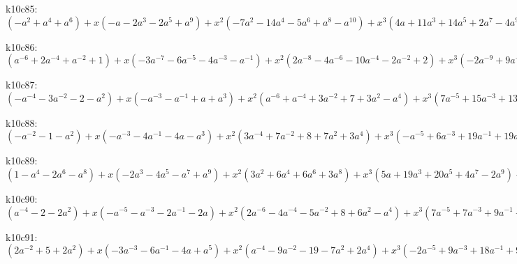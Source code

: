 k10c85: $ (-a^{2}+a^{4}+a^{6}) +x(-a-2a^{3}-2a^{5}+a^{9}) +x^{2}(-7a^{2}-14a^{4}-5a^{6}+a^{8}-a^{10}) +x^{3}(4a+11a^{3}+14a^{5}+2a^{7}-4a^{9}+a^{11}) +x^{4}(19a^{2}+37a^{4}+8a^{6}-7a^{8}+3a^{10}) +x^{5}(-4a-4a^{3}-15a^{5}-10a^{7}+5a^{9}) +x^{6}(-14a^{2}-32a^{4}-12a^{6}+6a^{8}) +x^{7}(a-5a^{3}+6a^{7}) +x^{8}(3a^{2}+8a^{4}+5a^{6}) +x^{9}(2a^{3}+2a^{5}) $

k10c86: $ (a^{-6}+2a^{-4}+a^{-2}+1) +x(-3a^{-7}-6a^{-5}-4a^{-3}-a^{-1}) +x^{2}(2a^{-8}-4a^{-6}-10a^{-4}-2a^{-2}+2) +x^{3}(-2a^{-9}+9a^{-7}+20a^{-5}+13a^{-3}+3a^{-1}-a) +x^{4}(-6a^{-8}+10a^{-6}+22a^{-4}-a^{-2}-7) +x^{5}(a^{-9}-11a^{-7}-18a^{-5}-17a^{-3}-10a^{-1}+a) +x^{6}(3a^{-8}-10a^{-6}-22a^{-4}-5a^{-2}+4) +x^{7}(5a^{-7}+5a^{-5}+6a^{-3}+6a^{-1}) +x^{8}(5a^{-6}+10a^{-4}+5a^{-2}) +x^{9}(2a^{-5}+2a^{-3}) $

k10c87: $ (-a^{-4}-3a^{-2}-2-a^{2}) +x(-a^{-3}-a^{-1}+a+a^{3}) +x^{2}(a^{-6}+a^{-4}+3a^{-2}+7+3a^{2}-a^{4}) +x^{3}(7a^{-5}+15a^{-3}+13a^{-1}+2a-3a^{3}) +x^{4}(-2a^{-6}+5a^{-4}+8a^{-2}-5-5a^{2}+a^{4}) +x^{5}(-11a^{-5}-23a^{-3}-21a^{-1}-6a+3a^{3}) +x^{6}(a^{-6}-12a^{-4}-21a^{-2}-3+5a^{2}) +x^{7}(4a^{-5}+5a^{-3}+7a^{-1}+6a) +x^{8}(5a^{-4}+10a^{-2}+5) +x^{9}(2a^{-3}+2a^{-1}) $

k10c88: $ (-a^{-2}-1-a^{2}) +x(-a^{-3}-4a^{-1}-4a-a^{3}) +x^{2}(3a^{-4}+7a^{-2}+8+7a^{2}+3a^{4}) +x^{3}(-a^{-5}+6a^{-3}+19a^{-1}+19a+6a^{3}-a^{5}) +x^{4}(-6a^{-4}-10a^{-2}-8-10a^{2}-6a^{4}) +x^{5}(a^{-5}-11a^{-3}-32a^{-1}-32a-11a^{3}+a^{5}) +x^{6}(4a^{-4}-2a^{-2}-12-2a^{2}+4a^{4}) +x^{7}(7a^{-3}+14a^{-1}+14a+7a^{3}) +x^{8}(6a^{-2}+12+6a^{2}) +x^{9}(2a^{-1}+2a) $

k10c89: $ (1-a^{4}-2a^{6}-a^{8}) +x(-2a^{3}-4a^{5}-a^{7}+a^{9}) +x^{2}(3a^{2}+6a^{4}+6a^{6}+3a^{8}) +x^{3}(5a+19a^{3}+20a^{5}+4a^{7}-2a^{9}) +x^{4}(-6-9a^{2}-2a^{4}-4a^{6}-5a^{8}) +x^{5}(a^{-1}-15a-35a^{3}-27a^{5}-7a^{7}+a^{9}) +x^{6}(5-4a^{2}-15a^{4}-3a^{6}+3a^{8}) +x^{7}(9a+15a^{3}+11a^{5}+5a^{7}) +x^{8}(7a^{2}+12a^{4}+5a^{6}) +x^{9}(2a^{3}+2a^{5}) $

k10c90: $ (a^{-4}-2-2a^{2}) +x(-a^{-5}-a^{-3}-2a^{-1}-2a) +x^{2}(2a^{-6}-4a^{-4}-5a^{-2}+8+6a^{2}-a^{4}) +x^{3}(7a^{-5}+7a^{-3}+9a^{-1}+7a-2a^{3}) +x^{4}(-3a^{-6}+9a^{-4}+15a^{-2}-6-8a^{2}+a^{4}) +x^{5}(-9a^{-5}-11a^{-3}-15a^{-1}-10a+3a^{3}) +x^{6}(a^{-6}-11a^{-4}-21a^{-2}-3+6a^{2}) +x^{7}(3a^{-5}+a^{-3}+5a^{-1}+7a) +x^{8}(4a^{-4}+9a^{-2}+5) +x^{9}(2a^{-3}+2a^{-1}) $

k10c91: $ (2a^{-2}+5+2a^{2}) +x(-3a^{-3}-6a^{-1}-4a+a^{5}) +x^{2}(a^{-4}-9a^{-2}-19-7a^{2}+2a^{4}) +x^{3}(-2a^{-5}+9a^{-3}+18a^{-1}+9a-2a^{5}) +x^{4}(-6a^{-4}+16a^{-2}+35+7a^{2}-6a^{4}) +x^{5}(a^{-5}-12a^{-3}-13a^{-1}-7a-6a^{3}+a^{5}) +x^{6}(3a^{-4}-13a^{-2}-26-7a^{2}+3a^{4}) +x^{7}(5a^{-3}+2a^{-1}+a+4a^{3}) +x^{8}(5a^{-2}+9+4a^{2}) +x^{9}(2a^{-1}+2a) $

